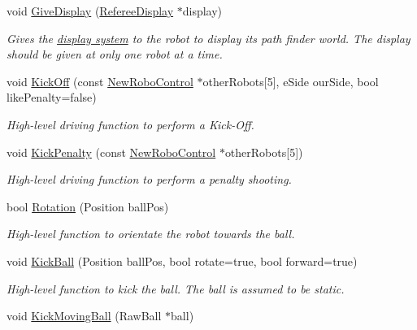 \begin{DoxyCompactItemize}
void \hyperlink{classTeamRobot_a2caa2411b9972fa5caa595f568394ba0}{GiveDisplay} (\hyperlink{classRefereeDisplay}{RefereeDisplay} $\ast$display)
\begin{DoxyCompactList}\small\item\em Gives the \hyperlink{classRefereeDisplay}{display system} to the robot to display its path finder world. The display should be given at only one robot at a time. \item\end{DoxyCompactList}\item 
void \hyperlink{classTeamRobot_a162c8b33d4315a61d8371dc9a923b37b}{KickOff} (const \hyperlink{classNewRoboControl}{NewRoboControl} $\ast$otherRobots\mbox{[}5\mbox{]}, eSide ourSide, bool likePenalty=false)
\begin{DoxyCompactList}\small\item\em High-\/level driving function to perform a Kick-\/Off. \item\end{DoxyCompactList}\item 
void \hyperlink{classTeamRobot_ad5755055df84960c8d1a0a40efe33668}{KickPenalty} (const \hyperlink{classNewRoboControl}{NewRoboControl} $\ast$otherRobots\mbox{[}5\mbox{]})
\begin{DoxyCompactList}\small\item\em High-\/level driving function to perform a penalty shooting. \item\end{DoxyCompactList}\item 
bool \hyperlink{classTeamRobot_aa1bb9ac05c067a68118c8646c8d71830}{Rotation} (Position ballPos)
\begin{DoxyCompactList}\small\item\em High-\/level function to orientate the robot towards the ball. \item\end{DoxyCompactList}\item 
void \hyperlink{classTeamRobot_a36d006bfeadfcdd37bd1eeb47223bdba}{KickBall} (Position ballPos, bool rotate=true, bool forward=true)
\begin{DoxyCompactList}\small\item\em High-\/level function to kick the ball. The ball is assumed to be static. \item\end{DoxyCompactList}\item 
void \hyperlink{classTeamRobot_a98d044ad3907493236b2d399a26cb9ac}{KickMovingBall} (RawBall $\ast$ball)

\end{DoxyCompactItemize}
